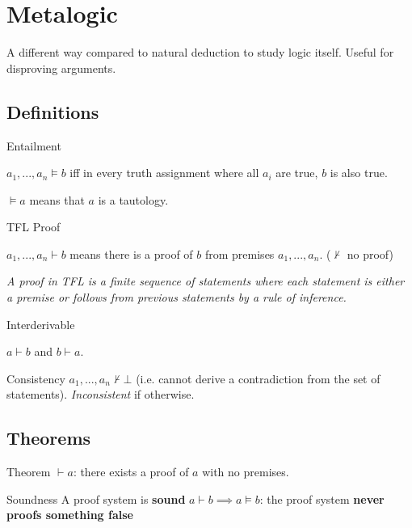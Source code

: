 \documentclass{article}
\begin{document}
\section{Metalogic}

A different way compared to natural deduction to study logic itself. Useful for disproving arguments.

\subsection{Definitions}

\begin{definition}
    {Entailment}

    $a_1, ..., a_n \models b$ iff in every truth assignment where all $a_i$ are true, $b$ is also true.

    $\models a$ means that $a$ is a tautology.
\end{definition}

\begin{definition}
    {TFL Proof}

    $a_1, ..., a_n \vdash b$ means there is a proof of $b$ from premises $a_1, ..., a_n$. ($\nvdash$ no proof)

    \textit{A proof in TFL is a finite sequence of statements where each statement is either a premise or follows from previous statements by a rule of inference.}
\end{definition}

\begin{definition}
    {Interderivable}

    $a \vdash b$ and $b \vdash a$.
\end{definition}

\begin{definition}
    {Consistency}
    $a_1, ..., a_n \nvdash \bot$ (i.e. cannot derive a contradiction from the set of statements). \textit{Inconsistent} if otherwise.
\end{definition}

\subsection{Theorems}

\begin{definition}
    {Theorem}
    $\vdash a$: there exists a proof of $a$ with no premises.
\end{definition}

\begin{theorem}
    {Soundness}
    A proof system is \textbf{sound} $a \vdash b \implies a \models b$: the proof system \textbf{never proofs something false}
\end{theorem}
\end{document}
